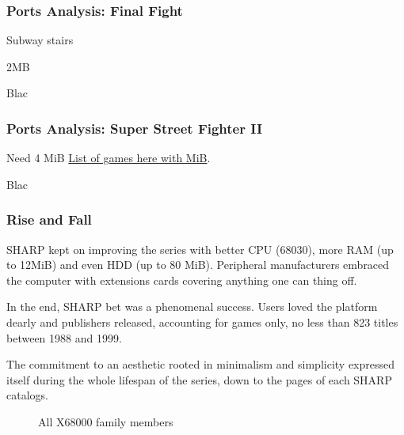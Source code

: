 \pagebreak

\subsubsection{Ports Analysis: Final Fight}
Subway stairs

2MB
\pagebreak

Blac

\pagebreak

\subsubsection{Ports Analysis: Super Street Fighter II}
Need 4 MiB \href{http://tkhr000.s601.xrea.com/x68softlist/x68soft.htm}{List of games here with MiB}.

\pagebreak

Blac

\pagebreak


\subsubsection{Rise and Fall}
 SHARP kept on improving the series with better CPU (68030), more RAM (up to 12MiB) and even HDD (up to 80 MiB). Peripheral manufacturers embraced the computer with extensions cards covering anything one can thing off. 

 In the end, SHARP bet was a phenomenal success. Users loved the platform dearly and publishers released, accounting for games only, no less than 823 titles between 1988 and 1999.



The commitment to an aesthetic rooted in minimalism and simplicity expressed itself during the whole lifespan of the series, down to the pages of each SHARP catalogs. 


 \begin{figure}[H]
\caption*{All X68000 family members}
\end{figure}

